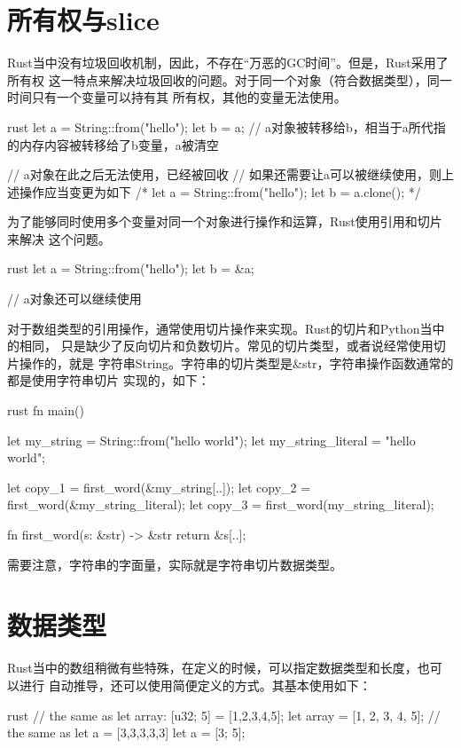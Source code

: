 \section{所有权与slice}
Rust当中没有垃圾回收机制，因此，不存在“万恶的GC时间”。但是，Rust采用了所有权
这一特点来解决垃圾回收的问题。对于同一个对象（符合数据类型），同一时间只有一个变量可以持有其
所有权，其他的变量无法使用。
\begin{code-block}{rust}
let a = String::from("hello");
let b = a; // a对象被转移给b，相当于a所代指的内存内容被转移给了b变量，a被清空

// a对象在此之后无法使用，已经被回收
// 如果还需要让a可以被继续使用，则上述操作应当变更为如下
/*
let a = String::from("hello");
let b = a.clone();
*/
\end{code-block}
为了能够同时使用多个变量对同一个对象进行操作和运算，Rust使用引用和切片来解决
这个问题。
\begin{code-block}{rust}
let a = String::from("hello");
let b = &a;

// a对象还可以继续使用
\end{code-block}

对于数组类型的引用操作，通常使用切片操作来实现。Rust的切片和Python当中的相同，
只是缺少了反向切片和负数切片。常见的切片类型，或者说经常使用切片操作的，就是
字符串String。字符串的切片类型是\&str，字符串操作函数通常的都是使用字符串切片
实现的，如下：
\begin{code-block}{rust}
fn main() {
    let my_string = String::from("hello world");
    let my_string_literal = "hello world";

    let copy_1 = first_word(&my_string[..]);
    let copy_2 = first_word(&my_string_literal);
    let copy_3 = first_word(my_string_literal);
}

fn first_word(s: &str) -> &str {
    return &s[..];
}
\end{code-block}
需要注意，字符串的字面量，实际就是字符串切片数据类型。

\section{数据类型}
Rust当中的数组稍微有些特殊，在定义的时候，可以指定数据类型和长度，也可以进行
自动推导，还可以使用简便定义的方式。其基本使用如下：
\begin{code-block}{rust}
// the same as let array: [u32; 5] = [1,2,3,4,5];
let array = [1, 2, 3, 4, 5];
// the same as let a = [3,3,3,3,3]
let a = [3; 5];
\end{code-block}

